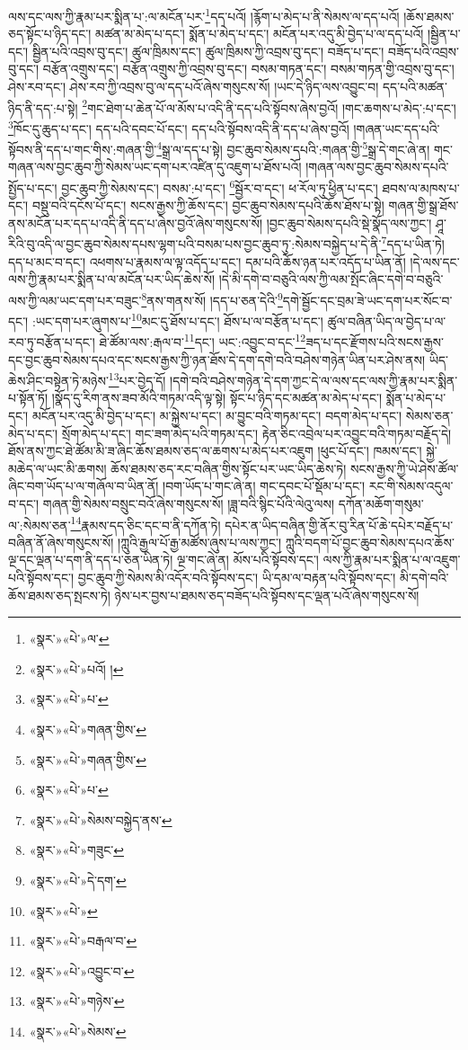 ལས་དང་ལས་ཀྱི་རྣམ་པར་སྨིན་པ་:ལ་མངོན་པར་\footnote{«སྣར་»«པེ་»ལ་}དད་པའོ། །རྙོག་པ་མེད་པ་ནི་སེམས་ལ་དད་པའོ། །ཆོས་ཐམས་ཅད་སྟོང་པ་ཉིད་དང་། མཚན་མ་མེད་པ་དང་། སྨོན་པ་མེད་པ་དང་། མངོན་པར་འདུ་མི་བྱེད་པ་ལ་དད་པའོ། །སྦྱིན་པ་དང་། སྦྱིན་པའི་འབྲས་བུ་དང་། ཚུལ་ཁྲིམས་དང་། ཚུལ་ཁྲིམས་ཀྱི་འབྲས་བུ་དང་། བཟོད་པ་དང་། བཟོད་པའི་འབྲས་བུ་དང་། བརྩོན་འགྲུས་དང་། བརྩོན་འགྲུས་ཀྱི་འབྲས་བུ་དང་། བསམ་གཏན་དང་། བསམ་གཏན་གྱི་འབྲས་བུ་དང་། ཤེས་རབ་དང་། ཤེས་རབ་ཀྱི་འབྲས་བུ་ལ་དད་པའོ་ཞེས་གསུངས་སོ། །ཡང་དེ་ཉིད་ལས་འབྱུང་བ། དད་པའི་མཚན་ཉིད་ནི་དད་:པ་སྟེ། \footnote{«སྣར་»«པེ་»པའོ། ། }གང་ཐེག་པ་ཆེན་པོ་ལ་མོས་པ་འདི་ནི་དད་པའི་སྟོབས་ཞེས་བྱའོ། །གང་ཆགས་པ་མེད་:པ་དང་། \footnote{«སྣར་»«པེ་»པ་}ཁོང་དུ་ཆུད་པ་དང་། དད་པའི་དབང་པོ་དང་། དད་པའི་སྟོབས་འདི་ནི་དད་པ་ཞེས་བྱའོ། །གཞན་ཡང་དད་པའི་སྟོབས་ནི་དད་པ་གང་གིས་:གཞན་གྱི་\footnote{«སྣར་»«པེ་»གཞན་གྱིས་}སྒྲ་ལ་དད་པ་སྟེ། བྱང་ཆུབ་སེམས་དཔའི་:གཞན་གྱི་\footnote{«སྣར་»«པེ་»གཞན་གྱིས་}སྒྲ་དེ་གང་ཞེ་ན། གང་གཞན་ལས་བྱང་ཆུབ་ཀྱི་སེམས་ཡང་དག་པར་འཛིན་དུ་འཇུག་པ་ཐོས་པའོ། །གཞན་ལས་བྱང་ཆུབ་སེམས་དཔའི་སྤྱོད་པ་དང་། བྱང་ཆུབ་ཀྱི་སེམས་དང་། བསམ་:པ་དང་། \footnote{«སྣར་»«པེ་»པ་}སྦྱོར་བ་དང་། ཕ་རོལ་ཏུ་ཕྱིན་པ་དང་། ཐབས་ལ་མཁས་པ་དང་། བསྡུ་བའི་དངོས་པོ་དང་། སངས་རྒྱས་ཀྱི་ཆོས་དང་། བྱང་ཆུབ་སེམས་དཔའི་ཆོས་ཐོས་པ་སྟེ། གཞན་གྱི་སྒྲ་ཐོས་ནས་མངོན་པར་དད་པ་འདི་ནི་དད་པ་ཞེས་བྱའོ་ཞེས་གསུངས་སོ། །བྱང་ཆུབ་སེམས་དཔའི་སྡེ་སྣོད་ལས་ཀྱང་། ཤཱ་རིའི་བུ་འདི་ལ་བྱང་ཆུབ་སེམས་དཔས་ལྷག་པའི་བསམ་པས་བྱང་ཆུབ་ཏུ་:སེམས་བསྐྱེད་པ་དེ་ནི་\footnote{«སྣར་»«པེ་»སེམས་བསྐྱེད་ནས་}དད་པ་ཡིན་ཏེ། དད་པ་མང་བ་དང་། འཕགས་པ་རྣམས་ལ་ལྟ་འདོད་པ་དང་། དམ་པའི་ཆོས་ཉན་པར་འདོད་པ་ཡིན་ནོ། །དེ་ལས་དང་ལས་ཀྱི་རྣམ་པར་སྨིན་པ་ལ་མངོན་པར་ཡིད་ཆེས་སོ། །དེ་མི་དགེ་བ་བཅུའི་ལས་ཀྱི་ལམ་སྤོང་ཞིང་དགེ་བ་བཅུའི་ལས་ཀྱི་ལམ་ཡང་དག་པར་བཟུང་\footnote{«སྣར་»«པེ་»གཟུང་}ནས་གནས་སོ། །དད་པ་ཅན་དེའི་\footnote{«སྣར་»«པེ་»དེ་དག་}དགེ་སྦྱོང་དང་བྲམ་ཟེ་ཡང་དག་པར་སོང་བ་དང་། :ཡང་དག་པར་ཞུགས་པ་\footnote{«སྣར་»«པེ་»}མང་དུ་ཐོས་པ་དང་། ཐོས་པ་ལ་བརྩོན་པ་དང་། ཚུལ་བཞིན་ཡིད་ལ་བྱེད་པ་ལ་རབ་ཏུ་བརྩོན་པ་དང་། ཐེ་ཚོམ་ལས་:རྒལ་བ་\footnote{«སྣར་»«པེ་»བརྒལ་བ་}དང་། ཡང་:འབྱུང་བ་དང་\footnote{«སྣར་»«པེ་»འབྱུང་བ་}ཟད་པ་དང་རྫོགས་པའི་སངས་རྒྱས་དང་བྱང་ཆུབ་སེམས་དཔའ་དང་སངས་རྒྱས་ཀྱི་ཉན་ཐོས་དེ་དག་དགེ་བའི་བཤེས་གཉེན་ཡིན་པར་ཤེས་ནས། ཡིད་ཆེས་ཤིང་བསྟེན་ཏེ་མཉེས་\footnote{«སྣར་»«པེ་»གཉེས་}པར་བྱེད་དོ། །དགེ་བའི་བཤེས་གཉེན་དེ་དག་ཀྱང་དེ་ལ་ལས་དང་ལས་ཀྱི་རྣམ་པར་སྨིན་པ་སྟོན་ཏོ། །སྣོད་དུ་རིག་ནས་ཟབ་མོའི་གཏམ་འདི་ལྟ་སྟེ། སྟོང་པ་ཉིད་དང་མཚན་མ་མེད་པ་དང་། སྨོན་པ་མེད་པ་དང་། མངོན་པར་འདུ་མི་བྱེད་པ་དང་། མ་སྐྱེས་པ་དང་། མ་བྱུང་བའི་གཏམ་དང་། བདག་མེད་པ་དང་། སེམས་ཅན་མེད་པ་དང་། སྲོག་མེད་པ་དང་། གང་ཟག་མེད་པའི་གཏམ་དང་། རྟེན་ཅིང་འབྲེལ་པར་འབྱུང་བའི་གཏམ་བརྗོད་དེ། ཐོས་ནས་ཀྱང་ཐེ་ཚོམ་མི་ཟ་ཞིང་ཆོས་ཐམས་ཅད་ལ་ཆགས་པ་མེད་པར་འཇུག །ཕུང་པོ་དང་། ཁམས་དང་། སྐྱེ་མཆེད་ལ་ཡང་མི་ཆགས། ཆོས་ཐམས་ཅད་རང་བཞིན་གྱིས་སྟོང་པར་ཡང་ཡིད་ཆེས་ཏེ། སངས་རྒྱས་ཀྱི་ཡེ་ཤེས་ཚོལ་ཞིང་བག་ཡོད་པ་ལ་གཞོལ་བ་ཡིན་ནོ། །བག་ཡོད་པ་གང་ཞེ་ན། གང་དབང་པོ་སྡོམ་པ་དང་། རང་གི་སེམས་འདུལ་བ་དང་། གཞན་གྱི་སེམས་བསྲུང་བའོ་ཞེས་གསུངས་སོ། །ཟླ་བའི་སྙིང་པོའི་ལེའུ་ལས། དཀོན་མཆོག་གསུམ་ལ་:སེམས་ཅན་\footnote{«སྣར་»«པེ་»སེམས་}རྣམས་དད་ཅིང་དང་བ་ནི་དཀོན་ཏེ། དཔེར་ན་ཡིད་བཞིན་གྱི་ནོར་བུ་རིན་པོ་ཆེ་དཔེར་བརྗོད་པ་བཞིན་ནོ་ཞེས་གསུངས་སོ། །ཀླུའི་རྒྱལ་པོ་རྒྱ་མཚོས་ཞུས་པ་ལས་ཀྱང་། ཀླུའི་བདག་པོ་བྱང་ཆུབ་སེམས་དཔའ་ཆོས་ལྔ་དང་ལྡན་པ་དག་ནི་དད་པ་ཅན་ཡིན་ཏེ། ལྔ་གང་ཞེ་ན། མོས་པའི་སྟོབས་དང་། ལས་ཀྱི་རྣམ་པར་སྨིན་པ་ལ་འཇུག་པའི་སྟོབས་དང་། བྱང་ཆུབ་ཀྱི་སེམས་མི་འདོར་བའི་སྟོབས་དང་། ཡི་དམ་ལ་བརྟན་པའི་སྟོབས་དང་། མི་དགེ་བའི་ཆོས་ཐམས་ཅད་སྤངས་ཏེ། ཉེས་པར་བྱས་པ་ཐམས་ཅད་བཟོད་པའི་སྟོབས་དང་ལྡན་པའོ་ཞེས་གསུངས་སོ། 